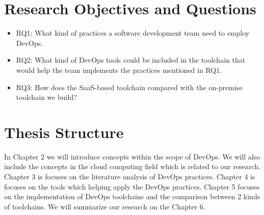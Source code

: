 \section{Research Objectives and Questions}
\begin{itemize}
    \item RQ1: What kind of practices a software development team need to employ DevOps.
    \item RQ2: What kind of DevOps tools could be included in the toolchain that would help the team implements the practices mentioned in RQ1.
    \item RQ3: How does the SaaS-based toolchain compared with the on-premise toolchain we build?
\end{itemize}
\section{Thesis Structure}
In Chapter 2 we will introduce concepts within the scope of DevOps. We will also include the concepts in the cloud computing field which is related to our research. Chapter 3 is focuses on the literature analysis of DevOps practices. Chapter 4 is focuses on the tools which helping apply the DevOps practices. Chapter 5 focuses on the implementation of DevOps toolchains and the comparison between 2 kinds of toolchains. We will summarize our research on the Chapter 6.
